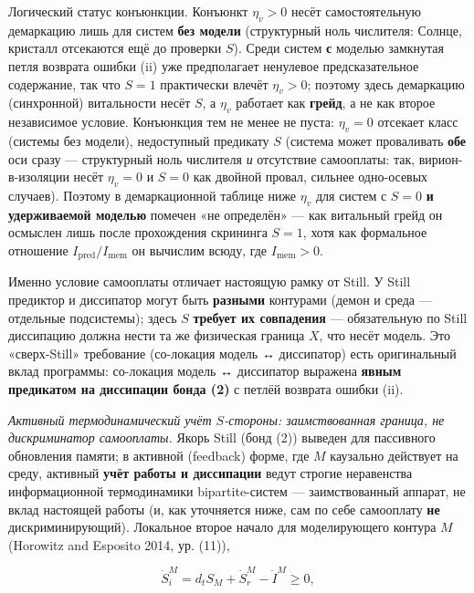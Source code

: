 \documentclass[pdflatex,sn-mathphys-ay]{sn-jnl}
\begin{document}
Логический статус конъюнкции. Конъюнкт \(\eta_v > 0\) несёт самостоятельную демаркацию лишь для систем \textbf{без модели} (структурный ноль числителя: Солнце, кристалл отсекаются ещё до проверки \(S\)). Среди систем \textbf{с} моделью замкнутая петля возврата ошибки (ii) уже предполагает ненулевое предсказательное содержание, так что \(S = 1\) практически влечёт \(\eta_v > 0\); поэтому здесь демаркацию (синхронной) витальности несёт \(S\), а \(\eta_v\) работает как \textbf{грейд}, а не как второе независимое условие. Конъюнкция тем не менее не пуста: \(\eta_v = 0\) отсекает класс (системы без модели), недоступный предикату \(S\) (система может проваливать \textbf{обе} оси сразу --- структурный ноль числителя \emph{и} отсутствие самооплаты: так, вирион-в-изоляции несёт \(\eta_v = 0\) и \(S = 0\) как двойной провал, сильнее одно-осевых случаев). Поэтому в демаркационной таблице ниже \(\eta_v\) для систем с \(S = 0\) \textbf{и удерживаемой моделью} помечен «не определён» --- как витальный грейд он осмыслен лишь после прохождения скрининга \(S = 1\), хотя как формальное отношение \(I_{\text{pred}}/I_{\text{mem}}\) он вычислим всюду, где \(I_{\text{mem}} > 0\).

Именно условие самооплаты отличает настоящую рамку от Still. У Still предиктор и диссипатор могут быть \textbf{разными} контурами (демон и среда --- отдельные подсистемы); здесь \(S\) \textbf{требует их совпадения} --- обязательную по Still диссипацию должна нести та же физическая граница \(X\), что несёт модель. Это «сверх-Still» требование (со-локация модель ↔ диссипатор) есть оригинальный вклад программы: со-локация модель ↔ диссипатор выражена \textbf{явным предикатом на диссипации бонда (2)} с петлёй возврата ошибки (ii).

\emph{Активный термодинамический учёт \(S\)-стороны: заимствованная граница, не дискриминатор самооплаты.} Якорь Still (бонд (2)) выведен для пассивного обновления памяти; в активной (feedback) форме, где \(M\) каузально действует на среду, активный \textbf{учёт работы и диссипации} ведут строгие неравенства информационной термодинамики bipartite-систем --- заимствованный аппарат, не вклад настоящей работы (и, как уточняется ниже, сам по себе самооплату \textbf{не} дискриминирующий). Локальное второе начало для моделирующего контура \(M\) (Horowitz and Esposito 2014, ур. (11)),

\[\dot S_i^{M} = d_t S_M + \dot S_r^{M} - \dot I^{M} \ge 0,\]
\end{document}
